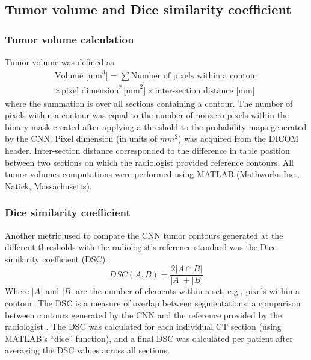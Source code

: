 \documentclass{article}
\begin{document}
\subsection{Tumor volume and Dice similarity coefficient}
\subsubsection{Tumor volume calculation}
Tumor volume was defined as:
\begin{multline}
    \text{Volume [mm}^3] = \sum \text{Number of pixels within a contour} \\ \times \text{pixel dimension}^2 \, \text{[mm}^2] \times \text{inter-section distance [mm]}
    \label{eq:volume}
\end{multline}
where the summation is over all sections containing a contour. The number of pixels within a contour was equal to the number of nonzero pixels within the binary mask created after applying a threshold to the probability maps generated by the CNN. Pixel dimension (in units of $mm^2$) was acquired from the DICOM header. Inter-section distance corresponded to the difference in table position between two sections on which the radiologist provided reference contours. All tumor volumes computations were performed using MATLAB (Mathworks Inc., Natick, Massachusetts).

\subsubsection{Dice similarity coefficient}
Another metric used to compare the CNN tumor contours generated at the different thresholds with the radiologist’s reference standard was the Dice similarity coefficient (DSC) \cite{Dice}:
\begin{equation}
    DSC(A,B) = \frac{2|A \cap B|}{|A|+|B|}
\end{equation}
Where $|A|$ and $|B|$ are the number of elements within a set, e.g., pixels within a contour. The DSC is a measure of overlap between segmentations: a comparison between contours generated by the CNN and the reference provided by the radiologist \cite{Metrics}. The DSC was calculated for each individual CT section (using MATLAB’s ``dice'' function), and a final DSC was calculated per patient after averaging the DSC values across all sections.
\end{document}
